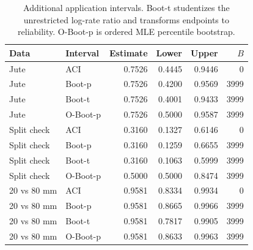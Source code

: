 \begin{table}[htbp]
\centering
\caption{Additional application intervals. Boot-t studentizes the unrestricted log-rate ratio and transforms endpoints to reliability. O-Boot-p is ordered MLE percentile bootstrap.}\label{tab:application-bootstrap}
\small
\begin{tabular}{llrrrr}
\toprule
Data & Interval & Estimate & Lower & Upper & $B$ \\
\midrule
Jute & ACI & 0.7526 & 0.4445 & 0.9446 & 0 \\
Jute & Boot-p & 0.7526 & 0.4200 & 0.9569 & 3999 \\
Jute & Boot-t & 0.7526 & 0.4001 & 0.9433 & 3999 \\
Jute & O-Boot-p & 0.7526 & 0.5000 & 0.9587 & 3999 \\
Split check & ACI & 0.3160 & 0.1327 & 0.6146 & 0 \\
Split check & Boot-p & 0.3160 & 0.1259 & 0.6655 & 3999 \\
Split check & Boot-t & 0.3160 & 0.1063 & 0.5999 & 3999 \\
Split check & O-Boot-p & 0.5000 & 0.5000 & 0.8474 & 3999 \\
20 vs 80 mm & ACI & 0.9581 & 0.8334 & 0.9934 & 0 \\
20 vs 80 mm & Boot-p & 0.9581 & 0.8665 & 0.9966 & 3999 \\
20 vs 80 mm & Boot-t & 0.9581 & 0.7817 & 0.9905 & 3999 \\
20 vs 80 mm & O-Boot-p & 0.9581 & 0.8633 & 0.9963 & 3999 \\
\bottomrule
\end{tabular}
\end{table}
